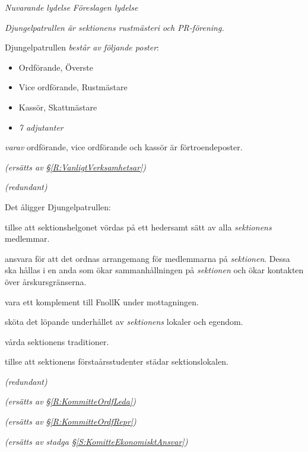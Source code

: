 \documentclass{article}
\newenvironment{lydelse}
    {\begin{paracol}{2}%
        \emph{Nuvarande lydelse}%
        \switchcolumn%
        \emph{Föreslagen lydelse}%
    \end{paracol}%
    \begin{enumerate}[label=\thesubsection.\arabic*]%
    \begin{paracol}{2}%
    }{\end{paracol}\end{enumerate}}
\begin{document}
\begin{lydelse}
    \item \emph{Djungelpatrullen är sektionens rustmästeri och PR-förening.}

    \item Djungelpatrullen \emph{består av följande poster}:
    \begin{itemize}
        \item Ordförande, Överste
    	\item Vice ordförande, Rustmästare
    	\item Kassör, Skattmästare
    	\item \emph{7 adjutanter}
    \end{itemize}
    \emph{varav} ordförande, vice ordförande och kassör är förtroendeposter.
    
    \item[] \emph{(ersätts av \S \ref{R:VanligtVerksamhetsar})}\vspace{1.2em}
    
    \item[] \emph{(redundant)}\vspace{6em}
    
    \item Det åligger Djungelpatrullen:\vspace{-0.2em}
    \begin{aligganden}
        \item tillse att sektionshelgonet vördas på ett hedersamt sätt av alla \emph{sektionens} medlemmar.\vspace{1.4em}
        \item ansvara för att det ordnas arrangemang för medlemmarna på \emph{sektionen}.
            Dessa ska hållas i en anda som ökar sammanhållningen på \emph{sektionen} och ökar kontakten över årskursgränserna.\vspace{0.2em}
        \item vara ett komplement till FnollK under mottagningen. \vspace{0.2em}
        \item sköta det löpande underhållet av \emph{sektionens} lokaler och egendom.\vspace{0.2em}
        \item vårda sektionens traditioner.
        \item tillse att sektionens förstaårsstudenter städar sektionslokalen.
        \label{R:Nollanstad}
    \end{aligganden}
    
    \vspace{1.2em}
    \begin{aligganden}
        \item[] \emph{(redundant)}\vspace{0.4em}
        \item[]
        \item[] \emph{(ersätts av \S \ref{R:KommitteOrdfLeda})}
        \item[] \emph{(ersätts av \S \ref{R:KommitteOrdfRepr})}\vspace{0.7em}
        \item[] \emph{(ersätts av stadga \S \ref{S:KomitteEkonomisktAnsvar})}
    \end{aligganden}
    

\end{lydelse}
\end{document}
